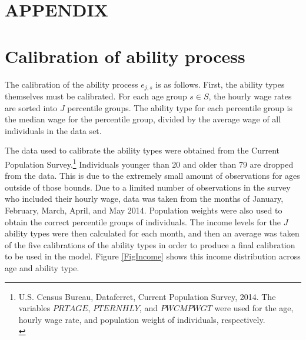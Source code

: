 \documentclass[letterpaper,12pt]{article}
\theoremstyle{definition}
\begin{document}
\section*{APPENDIX}                              %

\section{Calibration of ability process}\label{AppAbilCalib}

  The calibration of the ability process $e_{j,s}$ is as follows.  First, the ability types themselves must be calibrated. For each age group $s \in S$, the hourly wage rates are sorted into $J$ percentile groups.  The ability type for each percentile group is the median wage for the percentile group, divided by the average wage of all individuals in the data set.

  The data used to calibrate the ability types were obtained from the Current Population Survey.\footnote{U.S. Census Bureau, Dataferret, Current Population Survey, 2014. The variables $PRTAGE$, $PTERNHLY$, and $PWCMPWGT$ were used for the age, hourly wage rate, and population weight of individuals, respectively. \\ [-2pt]} Individuals younger than 20 and older than 79 are dropped from the data. This is due to the extremely small amount of observations for ages outside of those bounds. Due to a limited number of observations in the survey who included their hourly wage, data was taken from the months of January, February, March, April, and May 2014.  Population weights were also used to obtain the correct percentile groups of individuals.  The income levels for the $J$ ability types were then calculated for each month, and then an average was taken of the five calibrations of the ability types in order to produce a final calibration to be used in the model. Figure \ref{FigIncome} shows this income distribution across age and ability type.
\end{document}
